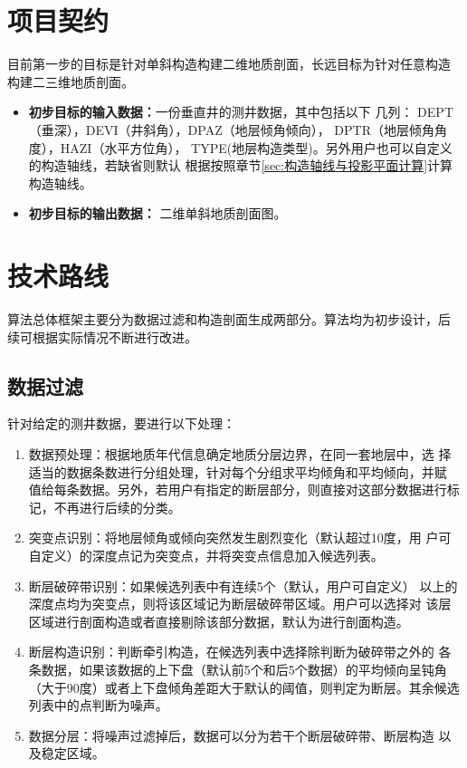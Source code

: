 \documentclass[a4paper,twoside]{ctexart}
\begin{document}
\section{项目契约}

目前第一步的目标是针对单斜构造构建二维地质剖面，长远目标为针对任意构造
构建二三维地质剖面。

\begin{itemize}
\item \textbf{初步目标的输入数据：}一份垂直井的测井数据，其中包括以下
  几列：
  DEPT（垂深），DEVI（井斜角），DPAZ（地层倾角倾向），
  DPTR（地层倾角角度），HAZI（水平方位角），
  TYPE(地层构造类型)。另外用户也可以自定义的构造轴线，若缺省则默认
  根据按照章节\ref{sec:构造轴线与投影平面计算}计算构造轴线。
\item \textbf{初步目标的输出数据：} 二维单斜地质剖面图。
\end{itemize}

\section{技术路线}

算法总体框架主要分为数据过滤和构造剖面生成两部分。算法均为初步设计，后
续可根据实际情况不断进行改进。

\subsection{数据过滤}

针对给定的测井数据，要进行以下处理：
\begin{enumerate}[步骤 1:]
\item 数据预处理：根据地质年代信息确定地质分层边界，在同一套地层中，选
  择适当的数据条数进行分组处理，针对每个分组求平均倾角和平均倾向，并赋
  值给每条数据。另外，若用户有指定的断层部分，则直接对这部分数据进行标
  记，不再进行后续的分类。
\item 突变点识别：将地层倾角或倾向突然发生剧烈变化（默认超过10度，用
  户可自定义）的深度点记为突变点，并将突变点信息加入候选列表。
\item 断层破碎带识别：如果候选列表中有连续5个（默认，用户可自定义）
  以上的深度点均为突变点，则将该区域记为断层破碎带区域。用户可以选择对
  该层区域进行剖面构造或者直接剔除该部分数据，默认为进行剖面构造。
\item 断层构造识别：判断牵引构造，在候选列表中选择除判断为破碎带之外的
  各条数据，如果该数据的上下盘（默认前5个和后5个数据）的平均倾向呈钝角
  （大于90度）或者上下盘倾角差距大于默认的阈值，则判定为断层。其余候选
  列表中的点判断为噪声。
\item 数据分层：将噪声过滤掉后，数据可以分为若干个断层破碎带、断层构造
  以及稳定区域。 
\end{enumerate}
\end{document}
